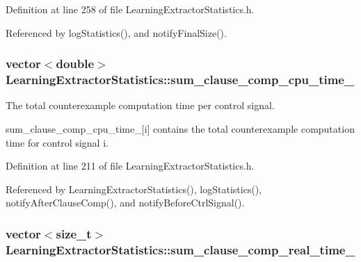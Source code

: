 Definition at line 258 of file Learning\-Extractor\-Statistics.\-h.



Referenced by log\-Statistics(), and notify\-Final\-Size().

\hypertarget{classLearningExtractorStatistics_a3e3c198d4480eb0b74410126bc2040e9}{
\subsubsection[{sum\-\_\-clause\-\_\-comp\-\_\-cpu\-\_\-time\-\_\-}]{\setlength{\rightskip}{0pt plus 5cm}vector$<$double$>$ Learning\-Extractor\-Statistics\-::sum\-\_\-clause\-\_\-comp\-\_\-cpu\-\_\-time\-\_\-\hspace{0.3cm}{\ttfamily [protected]}}}\label{classLearningExtractorStatistics_a3e3c198d4480eb0b74410126bc2040e9}


The total counterexample computation time per control signal. 

sum\-\_\-clause\-\_\-comp\-\_\-cpu\-\_\-time\-\_\-\mbox{[}i\mbox{]} contains the total counterexample computation time for control signal i. 

Definition at line 211 of file Learning\-Extractor\-Statistics.\-h.



Referenced by Learning\-Extractor\-Statistics(), log\-Statistics(), notify\-After\-Clause\-Comp(), and notify\-Before\-Ctrl\-Signal().

\hypertarget{classLearningExtractorStatistics_a505c22ba13094231793f0d5aeaf362f6}{
\subsubsection[{sum\-\_\-clause\-\_\-comp\-\_\-real\-\_\-time\-\_\-}]{\setlength{\rightskip}{0pt plus 5cm}vector$<$size\-\_\-t$>$ Learning\-Extractor\-Statistics\-::sum\-\_\-clause\-\_\-comp\-\_\-real\-\_\-time\-\_\-\hspace{0.3cm}{\ttfamily [protected]}}}\label{classLearningExtractorStatistics_a505c22ba13094231793f0d5aeaf362f6}


